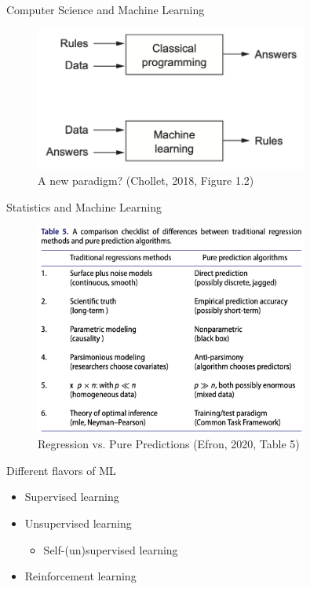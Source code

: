 \documentclass[10pt,handout]{beamer}
\begin{document}
\begin{frame}{Computer Science and Machine Learning}

\begin{figure}[h]
\caption{A new paradigm? (Chollet, 2018, Figure 1.2)}
\centering
\includegraphics[width=0.8\textwidth]{figs/fig1_2_chollet.png}
\end{figure}

\end{frame}


\begin{frame}{Statistics and Machine Learning}

\begin{figure}[h]
\caption{Regression vs. Pure Predictions (Efron, 2020, Table 5)}
\centering
\includegraphics[width=0.8\textwidth]{figs/table5.png}
\end{figure}

\end{frame}


\begin{frame}{Different flavors of ML}

\begin{itemize}
\item Supervised learning
\item Unsupervised learning
\begin{itemize}
\item Self-(un)supervised learning
\end{itemize}
\item Reinforcement learning
\end{itemize}

\end{frame}
\end{document}
